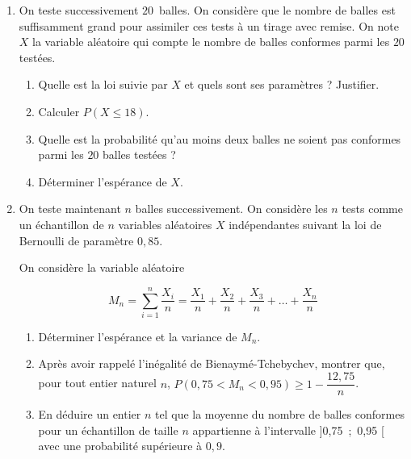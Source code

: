 \documentclass[10pt]{article}
\begin{document}
\medskip

\begin{enumerate}
\item On teste successivement $20$~balles. On considère que le nombre de balles est suffisamment grand pour assimiler ces tests à un tirage avec remise. On note $X$ la variable aléatoire qui compte le nombre de balles conformes parmi les $20$ testées.
	\begin{enumerate}
		\item Quelle est la loi suivie par $X$ et quels sont ses paramètres ? Justifier.
		\item Calculer $P(X \leqslant 18)$.
		\item Quelle est la probabilité qu'au moins deux balles ne soient pas conformes parmi les $20$ balles testées ?
		\item Déterminer l'espérance de $X$.
	\end{enumerate}
\item On teste maintenant $n$ balles successivement. On considère les $n$ tests comme un échantillon
de $n$ variables aléatoires $X$ indépendantes suivant la loi de Bernoulli de paramètre $0,85$.
	
On considère la variable aléatoire
	
\[M_n = \displaystyle\sum_{i=1}^n \dfrac{X_i}{n} = \dfrac{X_1}{n} + \dfrac{X_2}{n} + \dfrac{X_3}{n} + \ldots + \dfrac{X_n}{n}\]

	\begin{enumerate}
		\item Déterminer l'espérance et la variance de $M_n$.
		\item Après avoir rappelé l'inégalité de Bienaymé-Tchebychev, montrer que, pour tout entier naturel $n$,\: $P(0,75 < M_n < 0,95) \geqslant  1 - \dfrac{12,75}{n}$.
		\item En déduire un entier $n$ tel que la moyenne du nombre de balles conformes pour un échantillon de taille $n$ appartienne à l'intervalle ]0,75~;~0,95 [ avec une probabilité
supérieure à $0,9$.
	\end{enumerate}
\end{enumerate}

\vspace{0,5cm}
\end{document}
